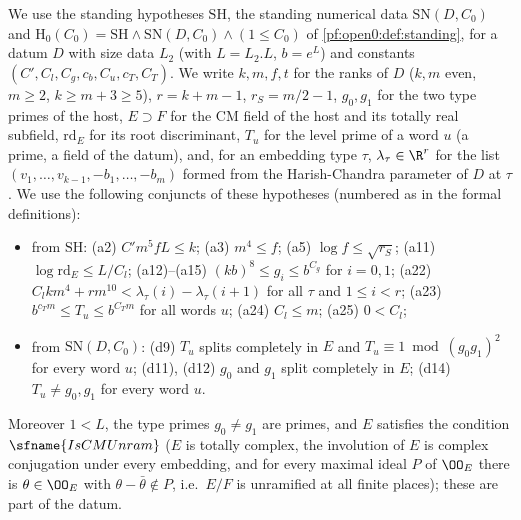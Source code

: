 We use the standing hypotheses $\mathrm{SH}$, the standing numerical data $\mathrm{SN}(D,C_0)$ and
$\mathrm{H}_0(C_0)=\mathrm{SH}\wedge\mathrm{SN}(D,C_0)\wedge(1\le C_0)$ of \cref{pf:open0:def:standing}, for a datum $D$ with
size data $L_2$ (with $L=L_2.L$, $b=e^L$) and constants $(C',C_l,C_g,c_b,C_u,c_T,C_T)$. We write $k,m,f,t$ for the
ranks of $D$ ($k,m$ even, $m\ge2$, $k\ge m+3\ge5$), $r=k+m-1$, $r_S=m/2-1$, $g_0,g_1$ for the two type primes of the host,
$E\supset F$ for the CM field of the host and its totally real subfield, $\mathrm{rd}_E$ for its root discriminant, $T_u$ for the
level prime of a word $u$ (a prime, a field of the datum), and, for an embedding type $\tau$, $\lambda_\tau\in\R^r$ for the list
$(v_1,\dots,v_{k-1},-b_1,\dots,-b_m)$ formed from the Harish-Chandra parameter of $D$ at $\tau$. We use the following conjuncts
of these hypotheses (numbered as in the formal definitions):
\begin{itemize}
\item from $\mathrm{SH}$: (a2) $C'm^5fL\le k$; (a3) $m^4\le f$; (a5) $\log f\le\sqrt{r_S}$; (a11) $\log\mathrm{rd}_E\le L/C_l$;
(a12)--(a15) $(kb)^8\le g_i\le b^{C_g}$ for $i=0,1$; (a22) $C_lkm^4+rm^{10}<\lambda_\tau(i)-\lambda_\tau(i+1)$ for all $\tau$ and
$1\le i<r$; (a23) $b^{c_Tm}\le T_u\le b^{C_Tm}$ for all words $u$; (a24) $C_l\le m$; (a25) $0<C_l$;
\item from $\mathrm{SN}(D,C_0)$: (d9) $T_u$ splits completely in $E$ and $T_u\equiv1\bmod(g_0g_1)^2$ for every word $u$;
(d11), (d12) $g_0$ and $g_1$ split completely in $E$; (d14) $T_u\ne g_0,g_1$ for every word $u$.
\end{itemize}
Moreover $1<L$, the type primes $g_0\ne g_1$ are primes, and $E$ satisfies the condition $\sfname{IsCMUnram}$ ($E$ is totally
complex, the involution of $E$ is complex conjugation under every embedding, and for every maximal ideal $P$ of $\OO_E$ there
is $\theta\in\OO_E$ with $\theta-\bar\theta\notin P$, i.e.\ $E/F$ is unramified at all finite places); these are part of the
datum.


